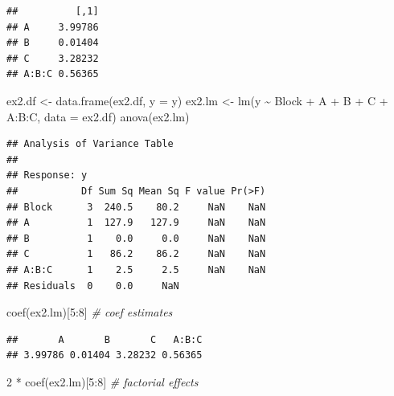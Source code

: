 \documentclass[
]{book}
\newenvironment{Shaded}{\begin{snugshade}}{\end{snugshade}}
\newcommand{\AttributeTok}[1]{\textcolor[rgb]{0.77,0.63,0.00}{#1}}
\newcommand{\CommentTok}[1]{\textcolor[rgb]{0.56,0.35,0.01}{\textit{#1}}}
\newcommand{\DecValTok}[1]{\textcolor[rgb]{0.00,0.00,0.81}{#1}}
\newcommand{\FunctionTok}[1]{\textcolor[rgb]{0.00,0.00,0.00}{#1}}
\newcommand{\NormalTok}[1]{#1}
\newcommand{\OtherTok}[1]{\textcolor[rgb]{0.56,0.35,0.01}{#1}}
\newcommand{\SpecialCharTok}[1]{\textcolor[rgb]{0.00,0.00,0.00}{#1}}
\theoremstyle{definition}
\theoremstyle{definition}
\theoremstyle{definition}
\theoremstyle{definition}
\theoremstyle{remark}
\begin{document}
\begin{verbatim}
##          [,1]
## A     3.99786
## B     0.01404
## C     3.28232
## A:B:C 0.56365
\end{verbatim}

\begin{Shaded}
\begin{Highlighting}[]
\NormalTok{ex2.df }\OtherTok{\textless{}{-}} \FunctionTok{data.frame}\NormalTok{(ex2.df, }\AttributeTok{y =}\NormalTok{ y)}
\NormalTok{ex2.lm }\OtherTok{\textless{}{-}} \FunctionTok{lm}\NormalTok{(y }\SpecialCharTok{\textasciitilde{}}\NormalTok{  Block }\SpecialCharTok{+}\NormalTok{ A }\SpecialCharTok{+}\NormalTok{ B }\SpecialCharTok{+}\NormalTok{ C }\SpecialCharTok{+}\NormalTok{ A}\SpecialCharTok{:}\NormalTok{B}\SpecialCharTok{:}\NormalTok{C, }\AttributeTok{data =}\NormalTok{ ex2.df)}
\FunctionTok{anova}\NormalTok{(ex2.lm)}
\end{Highlighting}
\end{Shaded}

\begin{verbatim}
## Analysis of Variance Table
## 
## Response: y
##           Df Sum Sq Mean Sq F value Pr(>F)
## Block      3  240.5    80.2     NaN    NaN
## A          1  127.9   127.9     NaN    NaN
## B          1    0.0     0.0     NaN    NaN
## C          1   86.2    86.2     NaN    NaN
## A:B:C      1    2.5     2.5     NaN    NaN
## Residuals  0    0.0     NaN
\end{verbatim}

\begin{Shaded}
\begin{Highlighting}[]
\FunctionTok{coef}\NormalTok{(ex2.lm)[}\DecValTok{5}\SpecialCharTok{:}\DecValTok{8}\NormalTok{] }\CommentTok{\# coef estimates}
\end{Highlighting}
\end{Shaded}

\begin{verbatim}
##       A       B       C   A:B:C 
## 3.99786 0.01404 3.28232 0.56365
\end{verbatim}

\begin{Shaded}
\begin{Highlighting}[]
\DecValTok{2} \SpecialCharTok{*} \FunctionTok{coef}\NormalTok{(ex2.lm)[}\DecValTok{5}\SpecialCharTok{:}\DecValTok{8}\NormalTok{] }\CommentTok{\# factorial effects}
\end{Highlighting}
\end{Shaded}
\end{document}
